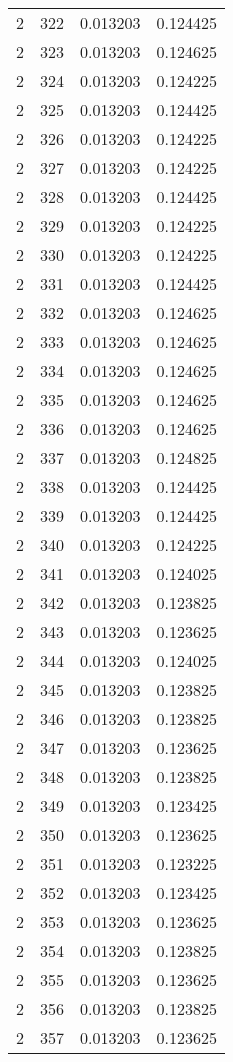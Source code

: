 \begin{longtable}{rrrr}
2 & 322 & 0.013203 & 0.124425 \\
2 & 323 & 0.013203 & 0.124625 \\
2 & 324 & 0.013203 & 0.124225 \\
2 & 325 & 0.013203 & 0.124425 \\
2 & 326 & 0.013203 & 0.124225 \\
2 & 327 & 0.013203 & 0.124225 \\
2 & 328 & 0.013203 & 0.124425 \\
2 & 329 & 0.013203 & 0.124225 \\
2 & 330 & 0.013203 & 0.124225 \\
2 & 331 & 0.013203 & 0.124425 \\
2 & 332 & 0.013203 & 0.124625 \\
2 & 333 & 0.013203 & 0.124625 \\
2 & 334 & 0.013203 & 0.124625 \\
2 & 335 & 0.013203 & 0.124625 \\
2 & 336 & 0.013203 & 0.124625 \\
2 & 337 & 0.013203 & 0.124825 \\
2 & 338 & 0.013203 & 0.124425 \\
2 & 339 & 0.013203 & 0.124425 \\
2 & 340 & 0.013203 & 0.124225 \\
2 & 341 & 0.013203 & 0.124025 \\
2 & 342 & 0.013203 & 0.123825 \\
2 & 343 & 0.013203 & 0.123625 \\
2 & 344 & 0.013203 & 0.124025 \\
2 & 345 & 0.013203 & 0.123825 \\
2 & 346 & 0.013203 & 0.123825 \\
2 & 347 & 0.013203 & 0.123625 \\
2 & 348 & 0.013203 & 0.123825 \\
2 & 349 & 0.013203 & 0.123425 \\
2 & 350 & 0.013203 & 0.123625 \\
2 & 351 & 0.013203 & 0.123225 \\
2 & 352 & 0.013203 & 0.123425 \\
2 & 353 & 0.013203 & 0.123625 \\
2 & 354 & 0.013203 & 0.123825 \\
2 & 355 & 0.013203 & 0.123625 \\
2 & 356 & 0.013203 & 0.123825 \\
2 & 357 & 0.013203 & 0.123625 \\

\end{longtable}
